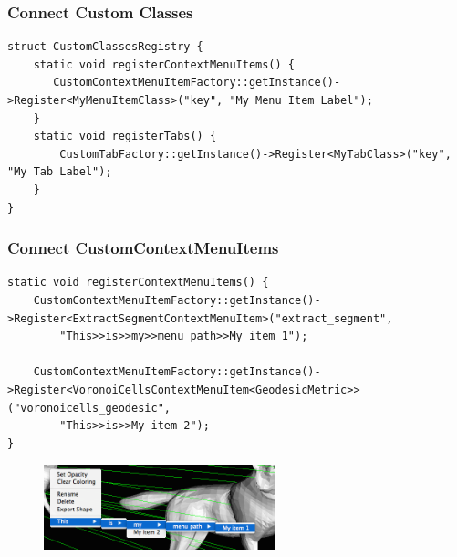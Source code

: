 \documentclass[compress]{beamer}
\begin{document}
\begin{frame}[fragile]
\frametitle{Connect Custom Classes}

\begin{lstlisting}
struct CustomClassesRegistry {
    static void registerContextMenuItems() {
       CustomContextMenuItemFactory::getInstance()->Register<MyMenuItemClass>("key", "My Menu Item Label");
    }
    static void registerTabs() {
        CustomTabFactory::getInstance()->Register<MyTabClass>("key", "My Tab Label");
    }
}
\end{lstlisting}
  
\end{frame}


\begin{frame}[fragile]
\frametitle{Connect CustomContextMenuItems}
\begin{lstlisting}
static void registerContextMenuItems() {
    CustomContextMenuItemFactory::getInstance()->Register<ExtractSegmentContextMenuItem>("extract_segment",
        "This>>is>>my>>menu path>>My item 1");
   
    CustomContextMenuItemFactory::getInstance()->Register<VoronoiCellsContextMenuItem<GeodesicMetric>>("voronoicells_geodesic",
        "This>>is>>My item 2");
}     
\end{lstlisting}
  \begin{figure}[h]
	\centering
	\includegraphics[width=0.60\textwidth]{menu.png}
\end{figure}
\end{frame}
\end{document}
